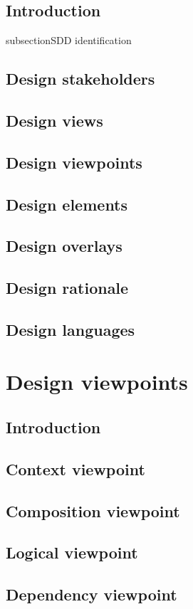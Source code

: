 \documentclass[10pt,journal,compsoc,onecolumn, draftclsnofoot]{IEEEtran}
\begin{document}
\subsection{Introduction}
subsection{SDD identification}
\subsection{Design stakeholders}
\subsection{Design views}
\subsection{Design viewpoints}
\subsection{Design elements}
\subsection{Design overlays}
\subsection{Design rationale}
\subsection{Design languages}

\section{Design viewpoints}
\subsection{Introduction}
\subsection{Context viewpoint}
\subsection{Composition viewpoint}
\subsection{Logical viewpoint}
\subsection{Dependency viewpoint}
\end{document}
